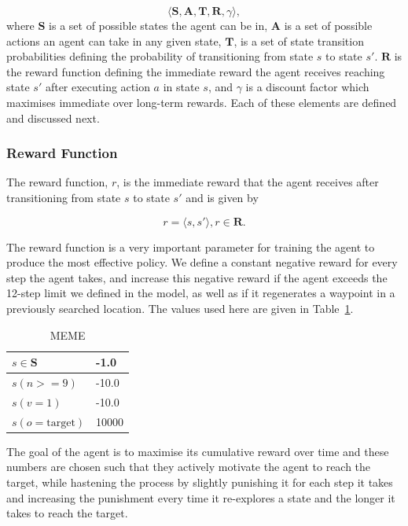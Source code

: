\documentclass[a4paper, twoside]{article}
\begin{document}
\begin{equation}
  \langle{}\mathbf{S}, \mathbf{A}, \mathbf{T}, \mathbf{R}, \gamma\rangle, 
\end{equation}
where $\mathbf{S}$ is a set of possible states the agent can be in, $\mathbf{A}$ is a set of possible actions an agent can take in any given state, $\mathbf{T}$, is a set of state transition probabilities defining the probability of transitioning from state $s$ to state $s'$. $\mathbf{R}$ is the reward function defining the immediate reward the agent receives reaching state $s'$ after executing action $a$ in state $s$, and $\gamma$ is a discount factor which maximises immediate over long-term rewards. Each of these elements are defined and discussed next.

\subsubsection{Reward Function}

\noindent The reward function, $r$, is the immediate reward that the agent receives after transitioning from state $s$ to state $s'$ and is given by 

\begin{equation}
  r = \langle{}s, s'\rangle, r\in{}\mathbf{R}.
\end{equation} 

The reward function is a very important parameter for training the agent to produce the most effective policy. We define a constant negative reward for every step the agent takes, and increase this negative reward if the agent exceeds the 12-step limit we defined in the model, as well as if it regenerates a waypoint in a previously searched location. The values used here are given in Table~\ref{tab:rewards}.

\begin{table}
  \centering
  \caption{MEME}\label{tab:rewards}
  \begin{tabular}{ll}
    \toprule
    $s\in\mathbf{S}$ & -1.0  \\ \midrule
    $s(n >= 9)$ & -10.0 \\ \midrule
    $s(v = 1)$  & -10.0 \\ \midrule
    $s(o = \text{target})$ & 10000 \\ \midrule
    \bottomrule
  \end{tabular}
\end{table}

The goal of the agent is to maximise its cumulative reward over time and these numbers are chosen such that they actively motivate the agent to reach the target, while hastening the process by slightly punishing it for each step it takes and increasing the punishment every time it re-explores a state and the longer it takes to reach the target. 
\end{document}
